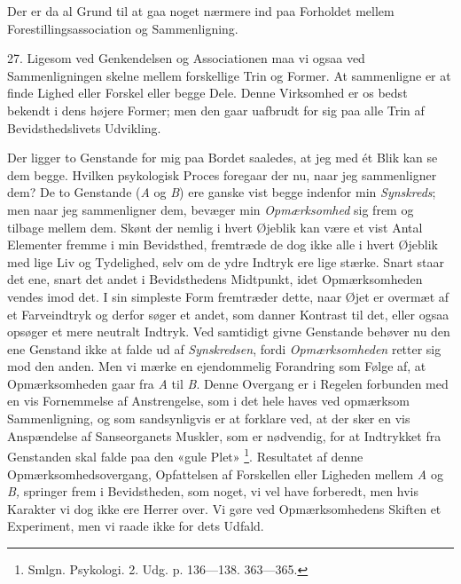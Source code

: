 \documentclass[12pt,a4paper,openany]{book}
\newcommand{\opage}[1]{\marginnote{\footnotesize\textit{[#1]}}}
\begin{document}
Der er da al Grund til at gaa noget nærmere ind paa Forholdet mellem
Forestillingsassociation og Sammenligning.

27. Ligesom ved Genkendelsen og Associationen maa vi ogsaa ved Sammenligningen
skelne mellem forskellige Trin og Former. At sammenligne er at finde Lighed
eller Forskel eller begge Dele. Denne Virksomhed er os bedst bekendt i dens
højere Former; men den gaar uafbrudt for sig paa alle Trin af Bevidsthedslivets
Udvikling.

\setcounter{footnote}{0}%
\opage{61}Der ligger to Genstande for mig paa Bordet saaledes, at jeg med ét
Blik kan se dem begge. Hvilken psykologisk Proces foregaar der nu, naar jeg
sammenligner dem? De to Genstande (\textit{A} og \textit{B}) ere ganske vist
begge indenfor min \emph{Synskreds}; men naar jeg sammenligner dem, bevæger min
\emph{Opmærksomhed} sig frem og tilbage mellem dem. Skønt der nemlig i hvert
Øjeblik kan være et vist Antal Elementer fremme i min Bevidsthed, fremtræde de
dog ikke alle i hvert Øjeblik med lige Liv og Tydelighed, selv om de ydre
Indtryk ere lige stærke. Snart staar det ene, snart det andet i Bevidsthedens
Midtpunkt, idet Opmærksomheden vendes imod det. I sin simpleste Form fremtræder
dette, naar Øjet er overmæt af et Farveindtryk og derfor søger et andet, som
danner Kontrast til det, eller ogsaa opsøger et mere neutralt Indtryk. Ved
samtidigt givne Genstande behøver nu den ene Genstand ikke at falde ud af
\emph{Synskredsen}, fordi \emph{Opmærksomheden} retter sig mod den anden. Men
vi mærke en ejendommelig Forandring som Følge af, at Opmærksomheden gaar fra
\textit{A} til \textit{B}. Denne Overgang er i Regelen forbunden med en vis
Fornemmelse af Anstrengelse, som i det hele haves ved opmærksom Sammenligning,
og som sandsynligvis er at forklare ved, at der sker en vis Anspændelse af
Sanseorganets Muskler, som er nødvendig, for at Indtrykket fra Genstanden skal
falde paa den «gule Plet»%
\footnote[1]{Smlgn. Psykologi. 2. Udg. p. 136---138. 363---365.}. Resultatet af
denne Opmærksomhedsovergang, Opfattelsen af Forskellen eller Ligheden mellem
\textit{A} og \textit{B,} springer frem i Bevidstheden, som noget, vi vel have
forberedt, men hvis Karakter vi dog ikke ere Herrer over. Vi gøre ved
Opmærksomhedens Skiften et Experiment, men vi raade ikke for dets Udfald.
\end{document}
